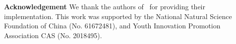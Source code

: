 \documentclass[10pt,twocolumn,letterpaper]{article}
\begin{document}






\noindent \textbf{Acknowledgement}
We thank the authors of~\cite{guo2015robust} for providing their implementation.
This work was supported by the National Natural Science Foundation of China (No. 61672481), and Youth Innovation Promotion Association CAS (No. 2018495).

{\small


}

\end{document}
